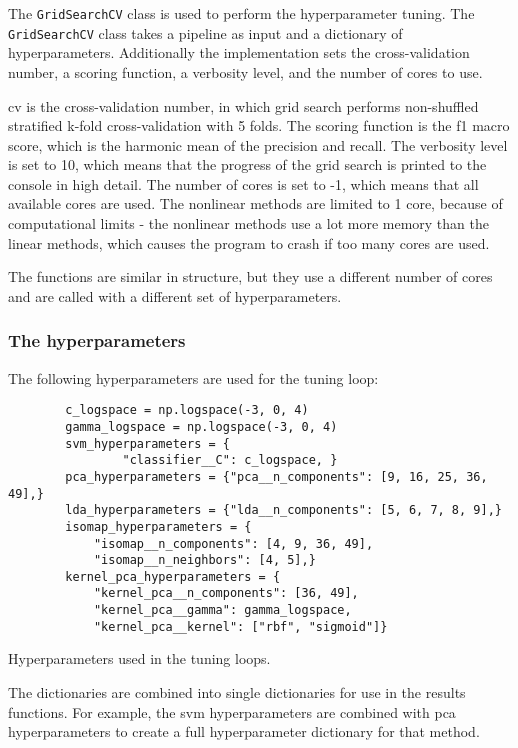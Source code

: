 The \texttt{GridSearchCV} class is used to perform the hyperparameter tuning. The \texttt{GridSearchCV} class takes a pipeline as input and a dictionary of hyperparameters. Additionally the implementation sets the cross-validation number, a scoring function, a verbosity level, and the number of cores to use.

cv is the cross-validation number, in which grid search performs non-shuffled stratified k-fold cross-validation with 5 folds. The scoring function is the f1 macro score, which is the harmonic mean of the precision and recall. The verbosity level is set to 10, which means that the progress of the grid search is printed to the console in high detail. The number of cores is set to -1, which means that all available cores are used. The nonlinear methods are limited to 1 core, because of computational limits - the nonlinear methods use a lot more memory than the linear methods, which causes the program to crash if too many cores are used.


The functions are similar in structure, but they use a different number of cores and are called with a different set of hyperparameters.

\subsubsection{The hyperparameters}\label{subsubsec:the-hyperparameters}
The following hyperparameters are used for the tuning loop:


\begin{listing}[htb!]
    \centering
    \begin{verbatim}
        c_logspace = np.logspace(-3, 0, 4)
        gamma_logspace = np.logspace(-3, 0, 4)
        svm_hyperparameters = {
                "classifier__C": c_logspace, }
        pca_hyperparameters = {"pca__n_components": [9, 16, 25, 36, 49],}
        lda_hyperparameters = {"lda__n_components": [5, 6, 7, 8, 9],}
        isomap_hyperparameters = {
            "isomap__n_components": [4, 9, 36, 49],
            "isomap__n_neighbors": [4, 5],}
        kernel_pca_hyperparameters = {
            "kernel_pca__n_components": [36, 49],
            "kernel_pca__gamma": gamma_logspace,
            "kernel_pca__kernel": ["rbf", "sigmoid"]}
    \end{verbatim}
    \caption{Hyperparameters used in the tuning loops.}
    \label{lst:hyperparameters-dictionaries}
\end{listing}


The dictionaries are combined into single dictionaries for use in the results functions. For example, the \gls{svm} hyperparameters are combined with \gls{pca} hyperparameters to create a full hyperparameter dictionary for that method.

